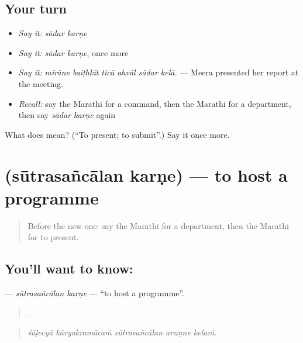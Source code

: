 \subsection*{Your turn}
\begin{itemize}
\raggedright
  \item \emph{Say it:} \emph{sādar karṇe}
  \item \emph{Say it:} \emph{sādar karṇe}, once more
  \item \emph{Say it:} \emph{mīrāne baiṭhkīt ticā ahvāl sādar kelā.} — Meera presented her report at the meeting.
  \item \emph{Recall:} say the Marathi for a command, then the Marathi for a department, then say \emph{sādar karṇe} again
\end{itemize}

\begin{tcolorbox}[breakable,colback=teal!4,colframe=teal!35!black,title={Before you move on}]
What does   mean? (\textquotedblleft{}To present; to submit\textquotedblright{}.) Say it once more.
\end{tcolorbox}
\section[\texorpdfstring{\mr{सूत्रसंचालन} \mr{करणे} (sūtrasañcālan karṇe)}{सूत्रसंचालन करणे (sūtrasañcālan karṇe)}]{  (sūtrasañcālan karṇe) — to host a programme}

\label{lesson:MR-C513-sutrasancalan-karne}



\begin{quote}
Before the new one: say the Marathi for a department, then the Marathi for to present.
\end{quote}

\subsection*{You'll want to know:  }
\textbf{ } — \emph{sūtrasañcālan karṇe} — \textquotedblleft{}to host a programme\textquotedblright{}.

\begin{quote}
    .
\end{quote}

\begin{quote}
\emph{śāḷecyā kāryakramācaṁ sūtrasañcālan aruṇne kelaṁ.}
\end{quote}

